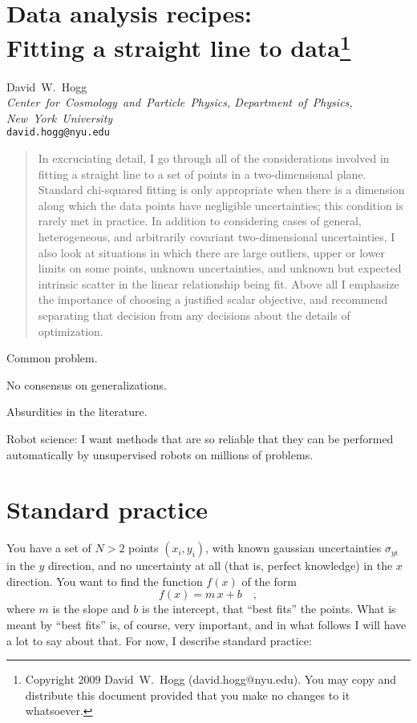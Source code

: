 \documentclass[12pt]{article}
\begin{document}
\section*{Data analysis recipes:\ \\
  Fitting a straight line to data\footnote{
    Copyright 2009 David~W.~Hogg (david.hogg@nyu.edu).  You may copy
    and distribute this document provided that you make no changes to
    it whatsoever.}}

\noindent
David~W.~Hogg\\
\textsl{Center~for~Cosmology~and~Particle~Physics, Department~of~Physics,\\
New~York~University}\\
\texttt{david.hogg@nyu.edu}

\begin{abstract}
  In excruciating detail, I go through all of the considerations
  involved in fitting a straight line to a set of points in a
  two-dimensional plane.  Standard chi-squared fitting is only
  appropriate when there is a dimension along which the data points
  have negligible uncertainties; this condition is rarely met in
  practice.  In addition to considering cases of general,
  heterogeneous, and arbitrarily covariant two-dimensional
  uncertainties, I also look at situations in which there are large
  outliers, upper or lower limits on some points, unknown
  uncertainties, and unknown but expected intrinsic scatter in the
  linear relationship being fit.  Above all I emphasize the importance
  of choosing a justified scalar objective, and recommend separating
  that decision from any decisions about the details of optimization.
\end{abstract}

Common problem.

No consensus on generalizations.

Absurdities in the literature.

Robot science: I want methods that are so reliable that they can be
performed automatically by unsupervised robots on millions of
problems.

\section{Standard practice}

You have a set of $N>2$ points $(x_i,y_i)$, with known gaussian
uncertainties $\sigma_{yi}$ in the $y$ direction, and no uncertainty
at all (that is, perfect knowledge) in the $x$ direction.  You want to
find the function $f(x)$ of the form
\begin{equation}
f(x) = m\,x + b \quad ,
\end{equation}
where $m$ is the slope and $b$ is the intercept, that ``best fits''
the points.  What is meant by ``best fits'' is, of course, very
important, and in what follows I will have a lot to say about that.
For now, I describe standard practice:
\end{document}
